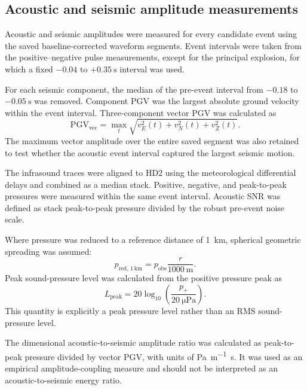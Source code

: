 \documentclass[12pt]{article}
\begin{document}
\subsection{Acoustic and seismic amplitude measurements}

Acoustic and seismic amplitudes were measured for every candidate event using
the saved baseline-corrected waveform segments. Event intervals were taken from
the positive--negative pulse measurements, except for the principal explosion,
for which a fixed $-0.04$ to $+\SI{0.35}{\second}$ interval was used.

For each seismic component, the median of the pre-event interval from $-0.18$ to
$-\SI{0.05}{\second}$ was removed. Component PGV was the largest absolute ground
velocity within the event interval. Three-component vector PGV was calculated as
\begin{equation}
  \mathrm{PGV}_{\mathrm{vec}}
  = \max_t\sqrt{v_E^2(t)+v_N^2(t)+v_Z^2(t)}.
  \label{eq:vector-pgv}
\end{equation}
The maximum vector amplitude over the entire saved segment was also retained to
test whether the acoustic event interval captured the largest seismic motion.

The infrasound traces were aligned to HD2 using the meteorological differential
delays and combined as a median stack. Positive, negative, and peak-to-peak
pressures were measured within the same event interval. Acoustic SNR was defined
as stack peak-to-peak pressure divided by the robust pre-event noise scale.

Where pressure was reduced to a reference distance of \SI{1}{\kilo\metre},
spherical geometric spreading was assumed:
\begin{equation}
  p_{\mathrm{red},\,1\,\mathrm{km}}
  = p_{\mathrm{obs}}\frac{r}{\SI{1000}{\metre}}.
  \label{eq:reduced-pressure}
\end{equation}
Peak sound-pressure level was calculated from the positive pressure peak as
\begin{equation}
  L_{\mathrm{peak}}
  = 20\log_{10}\left(\frac{p_+}{\SI{20}{\micro\pascal}}\right).
  \label{eq:peak-spl}
\end{equation}
This quantity is explicitly a peak pressure level rather than an RMS
sound-pressure level.

The dimensional acoustic-to-seismic amplitude ratio was calculated as
peak-to-peak pressure divided by vector PGV, with units of
\si{\pascal\per\metre\second}. It was used as an empirical amplitude-coupling
measure and should not be interpreted as an acoustic-to-seismic energy ratio.
\end{document}
